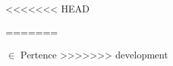 \begin{simbolos}
<<<<<<< HEAD

=======
  \item[$ \in $] Pertence
>>>>>>> development
\end{simbolos}
